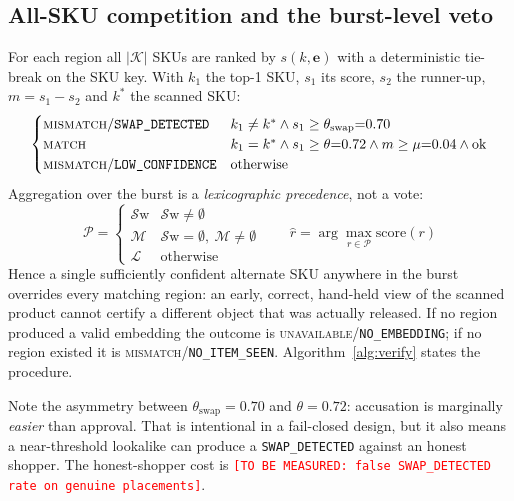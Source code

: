 \documentclass[conference]{IEEEtran}
\newcommand{\tbm}[1]{\textcolor{red}{\texttt{[TO BE MEASURED: #1]}}}
\begin{document}
\subsection{All-SKU competition and the burst-level veto}
For each region all $|\mathcal{K}|$ SKUs are ranked by $s(k,\mathbf{e})$ with a deterministic
tie-break on the SKU key. With $k_1$ the top-1 SKU, $s_1$ its score, $s_2$ the runner-up,
$m=s_1-s_2$ and $k^*$ the scanned SKU:
\begin{equation}
\begin{cases}
\textsc{mismatch}/\texttt{SWAP\_DETECTED} & k_1\neq k^* \wedge s_1\ge\theta_{\mathrm{swap}}{=}0.70\\
\textsc{match} & k_1 = k^* \wedge s_1\ge\theta{=}0.72 \wedge m\ge\mu{=}0.04 \wedge \text{ok}\\
\textsc{mismatch}/\texttt{LOW\_CONFIDENCE} & \text{otherwise}
\end{cases}
\end{equation}
Aggregation over the burst is a \emph{lexicographic precedence}, not a vote:
\begin{equation}
\mathcal{P} = \begin{cases}
\mathcal{S}\mathrm{w} & \mathcal{S}\mathrm{w}\neq\emptyset\\
\mathcal{M} & \mathcal{S}\mathrm{w}=\emptyset,\ \mathcal{M}\neq\emptyset\\
\mathcal{L} & \text{otherwise}
\end{cases}
\qquad \hat{r} = \arg\max_{r\in\mathcal{P}}\mathrm{score}(r)
\label{eq:veto}
\end{equation}
Hence a single sufficiently confident alternate SKU anywhere in the burst overrides every matching
region: an early, correct, hand-held view of the scanned product cannot certify a different object
that was actually released. If no region produced a valid embedding the outcome is
\textsc{unavailable}/\texttt{NO\_EMBEDDING}; if no region existed it is
\textsc{mismatch}/\texttt{NO\_ITEM\_SEEN}. Algorithm~\ref{alg:verify} states the procedure.

Note the asymmetry between $\theta_{\mathrm{swap}}=0.70$ and $\theta=0.72$: accusation is marginally
\emph{easier} than approval. That is intentional in a fail-closed design, but it also means a
near-threshold lookalike can produce a \texttt{SWAP\_DETECTED} against an honest shopper. The
honest-shopper cost is \tbm{false \texttt{SWAP\_DETECTED} rate on genuine placements}.
\end{document}
